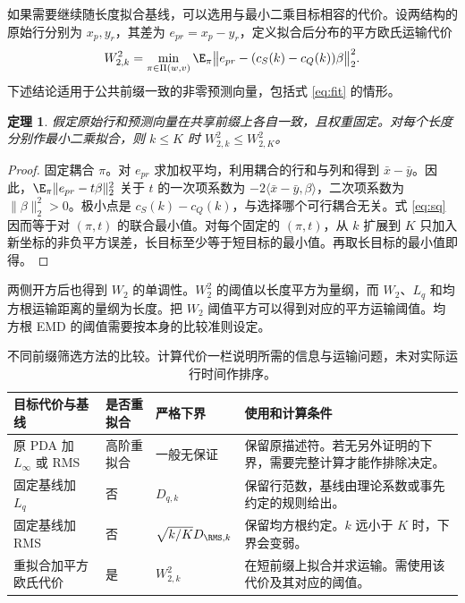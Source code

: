 \documentclass[11pt,a4paper,UTF8,fontset=fandol]{ctexart}
\newtheorem{theorem}{定理}
\theoremstyle{definition}
\begin{document}
如果需要继续随长度拟合基线，可以选用与最小二乘目标相容的代价。设两结构的原始行分别为 \(x_p,y_r\)，其差为 \(e_{pr}=x_p-y_r\)，定义拟合后分布的平方欧氏运输代价
\begin{equation}\label{eq:sq}
W_{2,k}^2=\min_{\pi\in\Pi(w,v)}\E_\pi
\bigl\|e_{pr}-(c_S(k)-c_Q(k))\beta\bigr\|_2^2 .
\end{equation}
下述结论适用于公共前缀一致的非零预测向量，包括式 \eqref{eq:fit} 的情形。

\begin{theorem}\label{thm:sq}
假定原始行和预测向量在共享前缀上各自一致，且权重固定。对每个长度分别作最小二乘拟合，则 \(k\le K\) 时 \(W_{2,k}^2\le W_{2,K}^2\)。
\end{theorem}

\begin{proof}
固定耦合 \(\pi\)。对 \(e_{pr}\) 求加权平均，利用耦合的行和与列和得到 \(\bar x-\bar y\)。因此，\(\E_\pi\|e_{pr}-t\beta\|_2^2\) 关于 \(t\) 的一次项系数为 \(-2\langle\bar x-\bar y,\beta\rangle\)，二次项系数为 \(\|\beta\|_2^2>0\)。极小点是 \(c_S(k)-c_Q(k)\)，与选择哪个可行耦合无关。式 \eqref{eq:sq} 因而等于对 \((\pi,t)\) 的联合最小值。对每个固定的 \((\pi,t)\)，从 \(k\) 扩展到 \(K\) 只加入新坐标的非负平方误差，长目标至少等于短目标的最小值。再取长目标的最小值即得。
\end{proof}

两侧开方后也得到 \(W_2\) 的单调性。\(W_2^2\) 的阈值以长度平方为量纲，而 \(W_2\)、\(L_q\) 和均方根运输距离的量纲为长度。把 \(W_2\) 阈值平方可以得到对应的平方运输阈值。均方根 EMD 的阈值需要按本身的比较准则设定。

\begin{table}[htbp]
\small\centering
\caption{不同前缀筛选方法的比较。计算代价一栏说明所需的信息与运输问题，未对实际运行时间作排序。}\label{tab:methods}
\begin{tabularx}{\linewidth}{p{.24\linewidth}p{.13\linewidth}p{.21\linewidth}Y}
\toprule
目标代价与基线 & 是否重拟合 & 严格下界 & 使用和计算条件\\
\midrule
原 PDA 加 \(L_\infty\) 或 RMS & 高阶重拟合 & 一般无保证 & 保留原描述符。若无另外证明的下界，需要完整计算才能作排除决定。\\
固定基线加 \(L_q\) & 否 & \(D_{q,k}\) & 保留行范数，基线由理论系数或事先约定的规则给出。\\
固定基线加 RMS & 否 & \(\sqrt{k/K}D_{\RMS,k}\) & 保留均方根约定。\(k\) 远小于 \(K\) 时，下界会变弱。\\
重拟合加平方欧氏代价 & 是 & \(W_{2,k}^2\) & 在短前缀上拟合并求运输。需使用该代价及其对应的阈值。\\
\bottomrule
\end{tabularx}
\end{table}
\end{document}
